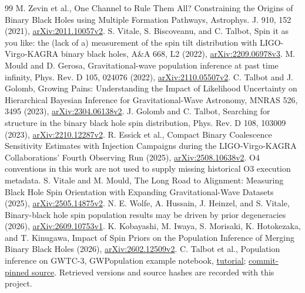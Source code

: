 \begin{thebibliography}{99}
 M. Zevin et al., One Channel to Rule Them All? Constraining the Origins of Binary Black Holes using Multiple Formation Pathways, Astrophys. J. 910, 152 (2021), \href{https://arxiv.org/abs/2011.10057v2}{arXiv:2011.10057v2}.
 S. Vitale, S. Biscoveanu, and C. Talbot, Spin it as you like: the (lack of a) measurement of the spin tilt distribution with LIGO-Virgo-KAGRA binary black holes, A\&A 668, L2 (2022), \href{https://arxiv.org/abs/2209.06978v3}{arXiv:2209.06978v3}.
 M. Mould and D. Gerosa, Gravitational-wave population inference at past time infinity, Phys. Rev. D 105, 024076 (2022), \href{https://arxiv.org/abs/2110.05507v2}{arXiv:2110.05507v2}.
 C. Talbot and J. Golomb, Growing Pains: Understanding the Impact of Likelihood Uncertainty on Hierarchical Bayesian Inference for Gravitational-Wave Astronomy, MNRAS 526, 3495 (2023), \href{https://arxiv.org/html/2304.06138v2}{arXiv:2304.06138v2}.
 J. Golomb and C. Talbot, Searching for structure in the binary black hole spin distribution, Phys. Rev. D 108, 103009 (2023), \href{https://arxiv.org/html/2210.12287v2}{arXiv:2210.12287v2}.
 R. Essick et al., Compact Binary Coalescence Sensitivity Estimates with Injection Campaigns during the LIGO-Virgo-KAGRA Collaborations' Fourth Observing Run (2025), \href{https://arxiv.org/html/2508.10638v2}{arXiv:2508.10638v2}. O4 conventions in this work are not used to supply missing historical O3 execution metadata.
 S. Vitale and M. Mould, The Long Road to Alignment: Measuring Black Hole Spin Orientation with Expanding Gravitational-Wave Datasets (2025), \href{https://arxiv.org/abs/2505.14875v2}{arXiv:2505.14875v2}.
 N. E. Wolfe, A. Hussain, J. Heinzel, and S. Vitale, Binary-black hole spin population results may be driven by prior degeneracies (2026), \href{https://arxiv.org/abs/2609.10753v1}{arXiv:2609.10753v1}.
 K. Kobayashi, M. Iwaya, S. Morisaki, K. Hotokezaka, and T. Kinugawa, Impact of Spin Priors on the Population Inference of Merging Binary Black Holes (2026), \href{https://arxiv.org/abs/2602.12509v2}{arXiv:2602.12509v2}.
 C. Talbot et al., Population inference on GWTC-3, GWPopulation example notebook, \href{https://colmtalbot.github.io/gwpopulation/examples/GWTC3.html}{tutorial}; \href{https://github.com/ColmTalbot/gwpopulation/blob/2daa71e8c56362f2f64e2166a0055478557f239a/examples/GWTC3.ipynb}{commit-pinned source}. Retrieved versions and source hashes are recorded with this project.

\end{thebibliography}
